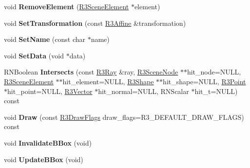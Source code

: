 \begin{DoxyCompactItemize}
\item 
void {\bfseries Remove\+Element} (\hyperlink{class_r3_scene_element}{R3\+Scene\+Element} $\ast$element)\hypertarget{class_r3_scene_node_a17b677f40a61ca6ac1150719f5cd65c1}{}\label{class_r3_scene_node_a17b677f40a61ca6ac1150719f5cd65c1}

\item 
void {\bfseries Set\+Transformation} (const \hyperlink{class_r3_affine}{R3\+Affine} \&transformation)\hypertarget{class_r3_scene_node_a7b37883c4be4d7fd84fcdfa4efc38aba}{}\label{class_r3_scene_node_a7b37883c4be4d7fd84fcdfa4efc38aba}

\item 
void {\bfseries Set\+Name} (const char $\ast$name)\hypertarget{class_r3_scene_node_a420889c83e290fa77e7d4afe42dc4d8a}{}\label{class_r3_scene_node_a420889c83e290fa77e7d4afe42dc4d8a}

\item 
void {\bfseries Set\+Data} (void $\ast$data)\hypertarget{class_r3_scene_node_adcde45ddb3df06dfa8f731146d913001}{}\label{class_r3_scene_node_adcde45ddb3df06dfa8f731146d913001}

\item 
R\+N\+Boolean {\bfseries Intersects} (const \hyperlink{class_r3_ray}{R3\+Ray} \&ray, \hyperlink{class_r3_scene_node}{R3\+Scene\+Node} $\ast$$\ast$hit\+\_\+node=N\+U\+LL, \hyperlink{class_r3_scene_element}{R3\+Scene\+Element} $\ast$$\ast$hit\+\_\+element=N\+U\+LL, \hyperlink{class_r3_shape}{R3\+Shape} $\ast$$\ast$hit\+\_\+shape=N\+U\+LL, \hyperlink{class_r3_point}{R3\+Point} $\ast$hit\+\_\+point=N\+U\+LL, \hyperlink{class_r3_vector}{R3\+Vector} $\ast$hit\+\_\+normal=N\+U\+LL, R\+N\+Scalar $\ast$hit\+\_\+t=N\+U\+LL) const \hypertarget{class_r3_scene_node_a0f029647533e51b4f69575d1afbb4d87}{}\label{class_r3_scene_node_a0f029647533e51b4f69575d1afbb4d87}

\item 
void {\bfseries Draw} (const \hyperlink{class_r_n_flags}{R3\+Draw\+Flags} draw\+\_\+flags=R3\+\_\+\+D\+E\+F\+A\+U\+L\+T\+\_\+\+D\+R\+A\+W\+\_\+\+F\+L\+A\+GS) const \hypertarget{class_r3_scene_node_aca30c1e93ee59d2201d7b8d1dffe9891}{}\label{class_r3_scene_node_aca30c1e93ee59d2201d7b8d1dffe9891}

\item 
void {\bfseries Invalidate\+B\+Box} (void)\hypertarget{class_r3_scene_node_aacf7b47064cb6511cd8e8fe0b39de1a7}{}\label{class_r3_scene_node_aacf7b47064cb6511cd8e8fe0b39de1a7}

\item 
void {\bfseries Update\+B\+Box} (void)\hypertarget{class_r3_scene_node_a6253d938a4d8a04e0101f2f4a336da4c}{}\label{class_r3_scene_node_a6253d938a4d8a04e0101f2f4a336da4c}

\end{DoxyCompactItemize}

